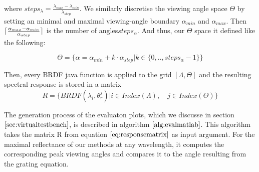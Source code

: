 where $steps_{\lambda} = \frac{\lambda_{max}-\lambda_{min}}{\lambda_{step}}$.  We similarly discretise the viewing angle space $\Theta$ by setting an minimal and maximal viewing-angle boundary $\alpha_{min}$ and $\alpha_{max}$. Then $\lceil\frac{\alpha_{max} - \alpha_{min}}{\alpha_{step}}\rceil$ is the number of angles$ steps_{\alpha}$. And thus, our $\Theta$ space it defined like the following:

\begin{equation}
\Theta = \{\alpha = \alpha_{min} + k \cdot \alpha_{step} | k \in \{0,..,steps_{\alpha}-1\}\}
\label{eq:thetaspacesetup}
\end{equation}

Then, every BRDF java function is applied to the grid $[\Lambda, \Theta]$ and the resulting spectral response is stored in a matrix
\begin{equation} 
R = \{BRDF(\lambda_i, \theta_{r}^{j}) | i \in Index(\Lambda), \quad j \in Index(\Theta)\}
\label{eq:responsematrix}
\end{equation}

The generation process of the evaluaton plots, which we discusse in section $\ref{sec:virtualtestbench}$, is described in algorithm $\ref{alg:evalmatlab}$. This algorithm takes the matrix R from equation $\ref{eq:responsematrix}$ as input argument. For the maximal reflectance of our methods at any wavelength, it computes the corresponding peak viewing angles and compares it to the angle resulting from the grating equation.

